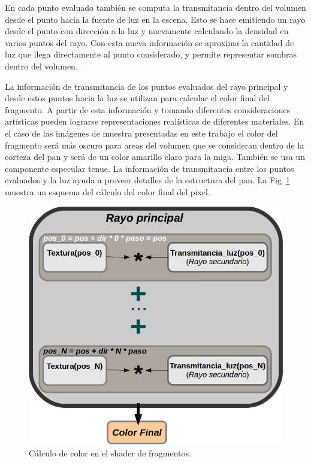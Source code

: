 En cada punto evaluado también se computa la transmitancia dentro del volumen desde el punto hacia la fuente de luz en la escena. Esto se hace emitiendo un rayo desde el punto con dirección a la luz y nuevamente calculando la densidad en varios puntos del rayo. Con esta nueva información se aproxima la cantidad de luz que llega directamente al punto considerado, y permite representar sombras dentro del volumen.

La información de transmitancia de los puntos evaluados del rayo principal y desde estos puntos hacia la luz se utilizan para calcular el color final del fragmento. A partir de esta información y tomando diferentes consideraciones artísticas pueden lograrse representaciones realísticas de diferentes materiales. En el caso de las imágenes de muestra presentadas en este trabajo el color del fragmento será más oscuro para areas del volumen que se consideran dentro de la corteza del pan y será de un color amarillo claro para la miga. También se usa un componente especular tenue. La información de transmitancia entre los puntos evaluados y la luz ayuda a proveer detalles de la estructura del pan. La Fig~\ref{fg:fragmentshader} muestra un esquema del cálculo del color final del pixel.

\begin{figure}[htb!]
  \centerline{\includegraphics[scale=0.5]{fragmentshader}}
  \caption{Cálculo de color en el shader de fragmentos. }
  \label{fg:fragmentshader}
\end{figure}


